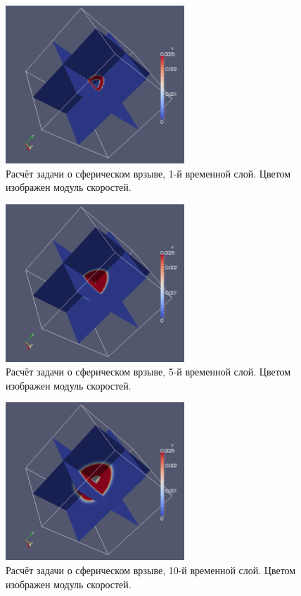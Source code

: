 \begin{figure}[htp]
\centering
\includegraphics[width=0.6\textwidth]{png/spherical-explosion-test/v-scalar/0001.png}
\caption{Расчёт задачи о сферическом врзыве, 1-й временной слой. Цветом изображен модуль скоростей.}
\label{pic:spherical_1}
\end{figure}

\begin{figure}[htp]
\centering
\includegraphics[width=0.6\textwidth]{png/spherical-explosion-test/v-scalar/0005.png}
\caption{Расчёт задачи о сферическом врзыве, 5-й временной слой. Цветом изображен модуль скоростей.}
\end{figure}

\begin{figure}[htp]
\centering
\includegraphics[width=0.6\textwidth]{png/spherical-explosion-test/v-scalar/0010.png}
\caption{Расчёт задачи о сферическом врзыве, 10-й временной слой. Цветом изображен модуль скоростей.}
\end{figure}

